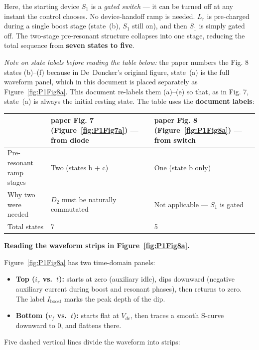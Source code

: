 \documentclass[12pt, a4paper]{article}
\def\,{ }%
\newcommand{\Vdc}{V_{dc}}
\newcommand{\vf}{v_f}
\newcommand{\ir}{i_r}
\newcommand{\Lr}{L_r}
\newcommand{\figref}[1]{Figure~\ref{#1}}
\begin{document}
Here, the starting device $S_1$ is a \emph{gated switch} --- it can be
turned off at any instant the control chooses.
No device-handoff ramp is needed.
$\Lr$ is pre-charged during a single boost stage (state~(b), $S_1$
still on), and then $S_1$ is simply gated off.
The two-stage pre-resonant structure collapses into one stage, reducing
the total sequence from \textbf{seven states to five}.

\smallskip
\textit{Note on state labels before reading the table below:}
the paper numbers the Fig.\,8 states (b)--(f) because in De~Doncker's
original figure, state~(a) is the full waveform panel, which in this
document is placed separately as \figref{fig:P1Fig8a}.
This document re-labels them (a)--(e) so that, as in Fig.\,7, state~(a) is
always the initial resting state.
The table uses the \textbf{document labels}:

\begin{center}
\renewcommand{\arraystretch}{1.25}
\begin{tabular}{p{3.2cm} p{5.2cm} p{5.0cm}}
\toprule
 & \textbf{paper Fig.\,7 (\figref{fig:P1Fig7a}) — from diode}
 & \textbf{paper Fig.\,8 (\figref{fig:P1Fig8a}) — from switch} \\
\midrule
Pre-resonant ramp stages & Two (states b + c) & One (state b only) \\
Why two were needed      & $D_2$ must be naturally commutated & Not applicable --- $S_1$ is gated \\
Total states             & 7 & 5 \\
\bottomrule
\end{tabular}
\end{center}

\medskip
\textbf{Reading the waveform strips in \figref{fig:P1Fig8a}.}

\figref{fig:P1Fig8a} has two time-domain panels:
\begin{itemize}
    \item \textbf{Top ($\ir$ vs.\ $t$):} starts at zero (auxiliary idle),
          dips downward (negative auxiliary current during boost and
          resonant phases), then returns to zero.
          The label $I_\text{boost}$ marks the peak depth of the dip.
    \item \textbf{Bottom ($\vf$ vs.\ $t$):} starts flat at $\Vdc$, then
          traces a smooth S-curve downward to $0$, and flattens there.
\end{itemize}

Five dashed vertical lines divide the waveform into strips:
\end{document}
